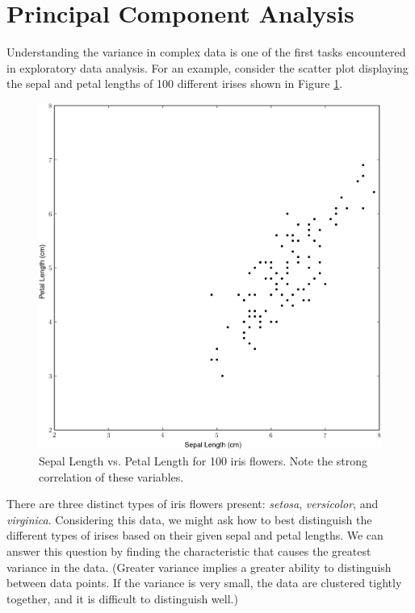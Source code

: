 \label{lab:pca}

\section*{Principal Component Analysis}
Understanding the variance in complex data is one of the first tasks encountered in exploratory data analysis. For an example, consider the scatter plot  displaying the sepal and petal lengths of 100 different irises shown in Figure \ref{fig:iris_1}.
\begin{figure}
\includegraphics[width=\textwidth]{iris0.pdf}
\caption{Sepal Length vs. Petal Length for 100 iris flowers. Note the strong correlation of these variables.}
\label{fig:iris_1}
\end{figure}
There are three distinct types of iris flowers present: \emph{setosa}, \emph{versicolor}, and \emph{virginica}.
Considering this data, we might ask how to best distinguish the different types of irises based on their given sepal and petal lengths.
We can answer this question by finding the characteristic that causes the greatest variance in the data.
(Greater variance implies a greater ability to distinguish between data points. If the variance is very small, the data are clustered tightly together, and it is difficult to distinguish well.)

